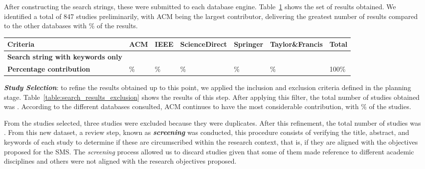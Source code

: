 After constructing the search strings, these were submitted to each database engine. Table~\ref{table:search_results} shows the set of results obtained. We identified a total of 847 studies preliminarily, with ACM being the largest contributor, delivering the greatest number of results compared to the other databases with \acmp\% of the results.

\begin{table}
	{\begin{tabular}{p{3.0cm}p{2.0cm}p{2.0cm}p{2.0cm}p{2.0cm}p{2.5cm}p{2.0cm}} \toprule
			\textbf{Criteria}                         & \textbf{ACM} & \textbf{IEEE} & \textbf{ScienceDirect} & \textbf{Springer} & \textbf{Taylor\&Francis} & \textbf{Total} \\
			\midrule
			\textbf{Search string with keywords only} & \acm{}       & \ieee{}       & \sd{}                  & \spr{}            & \tf{}                    & \tot{}         \\[2.5em]
			\textbf{Percentage contribution}          & \acmp{}\%    & \ieeep{}\%    & \sdp{}\%               & \sprp{}\%         & \tfp{}\%                 & 100\%          \\
			\bottomrule
		\end{tabular}}
	\label{table:search_results}
\end{table}




\textit{\textbf{Study Selection}}: to refine the results obtained up to this point, we applied the inclusion and exclusion criteria defined in the planning stage. Table~\ref{table:search_results_exclusion} shows the results of this step. After applying this filter, the total number of studies obtained was \itot. According to the different databases consulted, ACM continues to have the most considerable contribution, with \iacmp\% of the studies.


From the \itot{} studies selected, three studies were excluded because they were duplicates. After this refinement, the total number of studies was \depTot{}. From this new dataset, a review step, known as \textit{\textbf{screening}} was conducted, this procedure consists of verifying the title, abstract, and keywords of each study to determine if these are circumscribed within the research context, that is, if they are aligned with the objectives proposed for the SMS. The \textit{screening} process allowed us to discard \screen{} studies given that some of them made reference to different academic disciplines and others were not aligned with the research objectives proposed.

